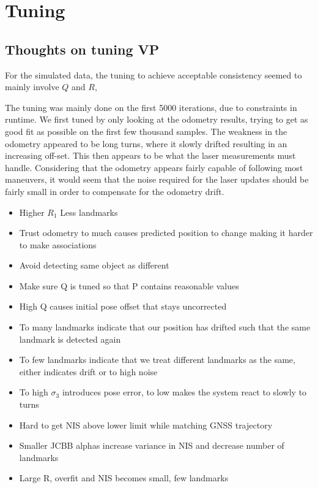 \section{Tuning}\label{sec:tuning}


\subsection{Thoughts on tuning VP}

For the simulated data, the tuning to achieve acceptable consistency seemed to mainly
involve $Q$ and $R$, 

The tuning was mainly done on the first 5000 iterations, due to constraints
in runtime.
We first tuned by only looking at the odometry results,
trying to get as good fit as possible on the first few thousand samples.
The weakness in the odometry appeared to be long turns, 
where it slowly drifted resulting in an increasing off-set.
This then appears to be what the laser measurements must handle.
Considering that the odometry appears fairly capable of following most 
maneuvers, it would seem that the noise required for the laser
updates should be fairly small in order to compensate
for the odometry drift. 

\begin{itemize}
    \item Higher $R_1$ Less landmarks
    \item Trust odometry to much causes predicted position to change making it harder to make associations
    \item Avoid detecting same object as different
    \item Make sure Q is tuned so that P contains reasonable values
    \item High Q causes initial pose offset that stays uncorrected
    \item To many landmarks indicate that our position has drifted such that the same landmark is detected again
    \item To few landmarks indicate that we treat different landmarks as the same, either indicates drift or to high noise
    \item To high $\sigma_3$ introduces pose error, to low makes the system react to slowly to turns
    \item Hard to get NIS above lower limit while matching GNSS trajectory
    \item Smaller JCBB alphas increase variance in NIS and decrease number of landmarks
    \item Large R, overfit and NIS becomes small, few landmarks
\end{itemize}



